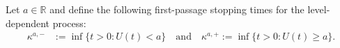 \documentclass[12pt,reqno]{amsart}
\theoremstyle{definition}
\theoremstyle{remark}
\begin{document}
\begin{comment}
&\leq \mathbb{E}_x\left[1_{\{\kappa^{(\varepsilon,a]}\leq t\}}g(\varepsilon,t-\kappa^{(\varepsilon,a]})\right].
\end{align*}
By monotonicity there exists $\kappa^{\{a\}}:=\lim_{\varepsilon\downarrow 0}\kappa^{(\varepsilon,a]}$, and the event $\{\kappa^{\{a\}}=t\}$ implies by the absence of positive jumps that $U(t)=a$. Hence by dominated convergence
\[
\mathbb{P}_x(\overline{U}(t)=a)\leq \mathbb{E}_x\left[1_{\{\kappa^{\{a\}}< t\}}\lim_{\varepsilon\downarrow 0}g(\varepsilon,t-\kappa^{(\varepsilon,a]})\right]+\mathbb{P}_x(U(t)=a).
\]
The preceding arguments allow us to conclude that $\mathbb{P}_x(\overline{U}(t)=a)=0$ for Lebesgue almost every $t>0$.
\end{proof}\end{comment}

Let $ a \in \mathbb{R}$ and define the following first-passage stopping times for the level-dependent process:
\begin{align*}
\kappa^{a,-} & := \inf\{t>0 \colon U(t)<a\} \quad \textrm{and} \quad \kappa^{a,+} := \inf\{t>0 \colon U(t)\geq a\}.
\end{align*}
\end{document}
